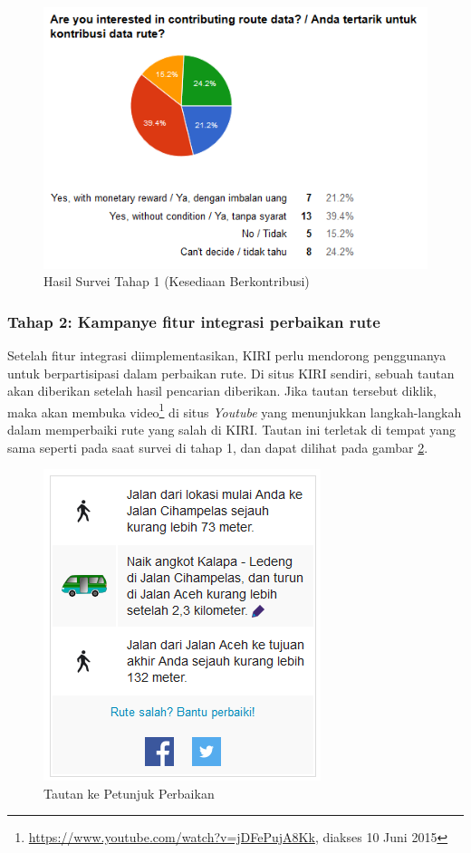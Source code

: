 \begin{figure}
	\centering
	\includegraphics[scale=0.75]{Gambar/5_hasilsurvei_1_3}
	\caption{Hasil Survei Tahap 1 (Kesediaan Berkontribusi)} 
	\label{fig:5_hasilsurvei_1_3}
\end{figure}

\subsubsection{Tahap 2: Kampanye fitur integrasi perbaikan rute}

Setelah fitur integrasi diimplementasikan, KIRI perlu mendorong penggunanya untuk berpartisipasi dalam perbaikan rute. Di situs KIRI sendiri, sebuah tautan akan diberikan setelah hasil pencarian diberikan. Jika tautan tersebut diklik, maka akan membuka video\footnote{\url{https://www.youtube.com/watch?v=jDFePujA8Kk}, diakses 10 Juni 2015} di situs \textit{Youtube} yang menunjukkan langkah-langkah dalam memperbaiki rute yang salah di KIRI. Tautan ini terletak di tempat yang sama seperti pada saat survei di tahap 1, dan dapat dilihat pada gambar \ref{fig:5_petunjuk}.

\begin{figure}
	\centering
	\includegraphics[scale=0.75]{Gambar/5_petunjuk}
	\caption{Tautan ke Petunjuk Perbaikan} 
	\label{fig:5_petunjuk}
\end{figure}

